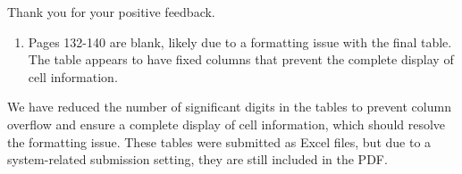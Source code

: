 \documentclass[
  12pt,
  letterpaper,
  DIV=11,
  numbers=noendperiod]{scrartcl}
\providecommand{\tightlist}{%
  \setlength{\itemsep}{0pt}\setlength{\parskip}{0pt}}\usepackage{longtable,booktabs,array}
\renewenvironment{quote}
  {\begin{customblockquote}\color{blockquote-text}\ignorespaces}
  {\end{customblockquote}}
\begin{document}
Thank you for your positive feedback.

\begin{quote}
\begin{enumerate}
\def\labelenumi{\arabic{enumi})}
\setcounter{enumi}{4}
\tightlist
\item
  Pages 132-140 are blank, likely due to a formatting issue with the
  final table. The table appears to have fixed columns that prevent the
  complete display of cell information.
\end{enumerate}
\end{quote}

We have reduced the number of significant digits in the tables to
prevent column overflow and ensure a complete display of cell
information, which should resolve the formatting issue. These tables
were submitted as Excel files, but due to a system-related submission
setting, they are still included in the PDF.
\end{document}
